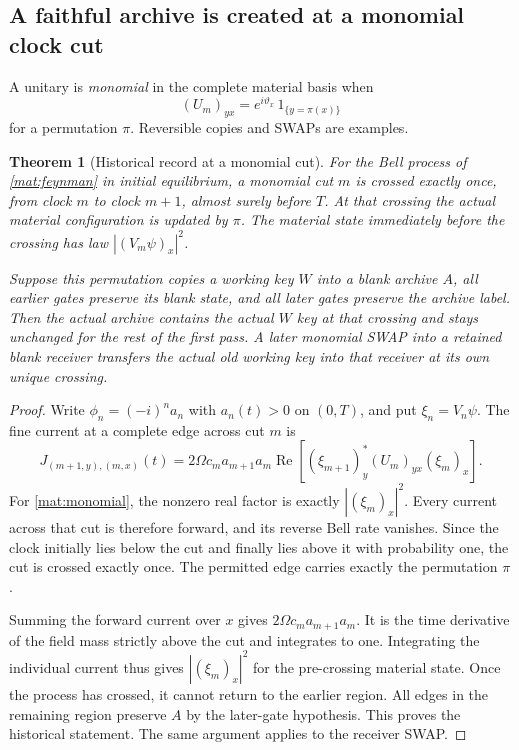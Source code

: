 \documentclass[11pt]{article}
\newtheorem{theorem}{Theorem}[section]
\theoremstyle{definition}\newtheorem{definition}[theorem]{Definition}
\theoremstyle{remark}\newtheorem{remark}[theorem]{Remark}
\begin{document}
\subsection{A faithful archive is created at a monomial clock cut}

A unitary is \emph{monomial} in the complete material basis when
\begin{equation}\label{mat:monomial}
 (U_m)_{yx}=e^{i\vartheta_x}\,1_{\{y=\pi(x)\}}
\end{equation}
for a permutation $\pi$.  Reversible copies and SWAPs are examples.

\begin{theorem}[Historical record at a monomial cut]\label{mat:copy}
For the Bell process of \eqref{mat:feynman} in initial equilibrium, a
monomial cut $m$ is crossed exactly once, from clock $m$ to clock $m+1$,
almost surely before $T$.  At that crossing the actual material
configuration is updated by $\pi$.  The material state immediately
before the crossing has law $|(V_m\psi)_x|^2$.

Suppose this permutation copies a working key $W$ into a blank archive
$A$, all earlier gates preserve its blank state, and all later gates
preserve the archive label.  Then the actual archive contains the
actual $W$ key at that crossing and stays unchanged for the rest of
the first pass.  A later monomial SWAP into a retained blank receiver
transfers the actual old working key into that receiver at its own
unique crossing.
\end{theorem}
\begin{proof}
Write $\phi_n=(-i)^n a_n$ with $a_n(t)>0$ on $(0,T)$, and put
$\xi_n=V_n\psi$.  The fine current at a complete edge across cut $m$ is
\begin{equation}\label{mat:finecurrent}
 J_{(m+1,y),(m,x)}(t)=2\Omega c_ma_{m+1}a_m
   \operatorname{Re}\left[(\xi_{m+1})_y^*(U_m)_{yx}(\xi_m)_x\right].
\end{equation}
For \eqref{mat:monomial}, the nonzero real factor is exactly
$|(\xi_m)_x|^2$.  Every current across that cut is therefore forward,
and its reverse Bell rate vanishes.  Since the clock initially lies
below the cut and finally lies above it with probability one, the
cut is crossed exactly once.  The permitted edge carries exactly
the permutation $\pi$.

Summing the forward current over $x$ gives
$2\Omega c_ma_{m+1}a_m$.  It is the time derivative of the field mass
strictly above the cut and integrates to one.  Integrating the
individual current thus gives $|(\xi_m)_x|^2$ for the pre-crossing
material state.  Once the process has crossed, it cannot return to
the earlier region.  All edges in the remaining region preserve $A$
by the later-gate hypothesis.  This proves the historical statement.
The same argument applies to the receiver SWAP.
\end{proof}
\end{document}
